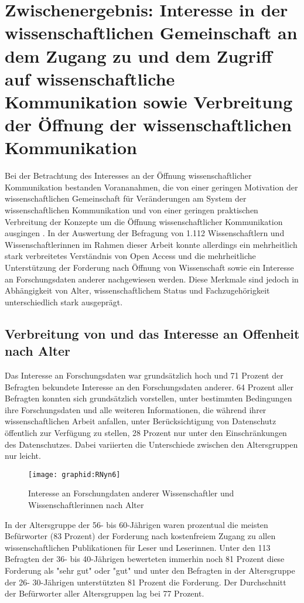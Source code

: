 \section{Zwischenergebnis: Interesse in der wissenschaftlichen Gemeinschaft an dem Zugang zu und dem Zugriff auf wissenschaftliche Kommunikation sowie Verbreitung der Öffnung der wissenschaftlichen Kommunikation}

Bei der Betrachtung des Interesses an der Öffnung wissenschaftlicher Kommunikation bestanden Vorananahmen, die von einer geringen Motivation der wissenschaftlichen Gemeinschaft für Veränderungen am System der wissenschaftlichen Kommunikation \cite{Hagner_2015} und von einer geringen praktischen Verbreitung der Konzepte um die Öffnung wissenschaftlicher Kommunikation ausgingen \cite{Scheliga_2014}. In der Auswertung der Befragung von 1.112 Wissenschaftlern und Wissenschaftlerinnen im Rahmen dieser Arbeit konnte allerdings ein mehrheitlich stark verbreitetes Verständnis von Open Access und die mehrheitliche Unterstützung der Forderung nach Öffnung von Wissenschaft sowie ein Interesse an Forschungsdaten anderer nachgewiesen werden. Diese Merkmale sind jedoch in Abhängigkeit von Alter, wissenschaftlichem Status und Fachzugehörigkeit unterschiedlich stark ausgeprägt.

\subsection{Verbreitung von und das Interesse an Offenheit nach Alter}

Das Interesse an Forschungsdaten war grundsätzlich hoch und 71 Prozent der Befragten bekundete Interesse an den Forschungsdaten anderer. 64 Prozent aller Befragten konnten sich grundsätzlich vorstellen, unter bestimmten Bedingungen ihre Forschungsdaten und alle weiteren Informationen, die während ihrer wissenschaftlichen Arbeit anfallen, unter Berücksichtigung von Datenschutz öffentlich zur Verfügung zu stellen, 28 Prozent nur unter den Einschränkungen des Datenschutzes. Dabei variierten die Unterschiede zwischen den Altersgruppen nur leicht.

\begin{figure}[h!]
\texttt{[image: graphid:RNyn6]}
\caption{Interesse an Forschungdaten anderer Wissenschaftler und Wissenschaftlerinnen nach Alter}
\end{figure}

In der Altersgruppe der 56- bis 60-Jährigen waren prozentual die meisten Befürworter (83 Prozent) der Forderung nach kostenfreiem Zugang zu allen wissenschaftlichen Publikationen für Leser und Leserinnen. Unter den 113 Befragten der 36- bis 40-Jährigen bewerteten immerhin noch 81 Prozent diese Forderung als "sehr gut" oder "gut" und unter den Befragten in der Altersgruppe der 26- 30-Jährigen unterstützten 81 Prozent die Forderung. Der Durchschnitt der Befürworter aller Altersgruppen lag bei 77 Prozent.

